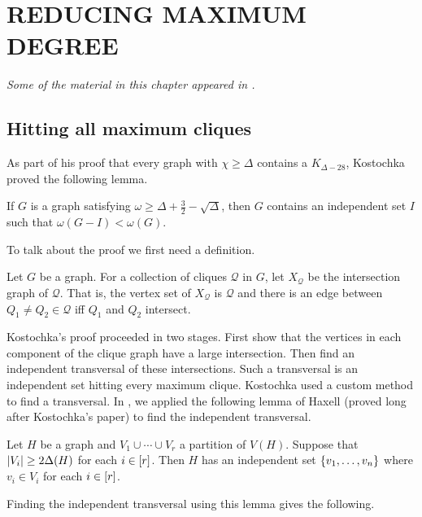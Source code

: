 \chapter{REDUCING MAXIMUM DEGREE}\label{ReductionChapter}

\begin{center}
\emph{Some of the material in this chapter appeared in
\cite{rabernhitting}.}
\end{center}

\section{Hitting all maximum cliques}
As part of his proof that every graph with $\chi \geq \Delta$ contains a $K_{\Delta - 28}$, Kostochka proved the following lemma.

\begin{lem}\label{KostochkaHitting}
If $G$ is a graph satisfying $\omega \geq \Delta + \frac32 - \sqrt{\Delta}$, then $G$ contains an independent set $I$ such that $\omega(G - I) < \omega(G)$.
\end{lem}

To talk about the proof we first need a definition.

\begin{CliqueGraph}
Let $G$ be a graph. For a collection of cliques $\mathcal{Q}$ in $G$, let $X_{\mathcal{Q}}$ be the intersection graph of $\mathcal{Q}$.  That is, the vertex set of $X_{\mathcal{Q}}$ is $\mathcal{Q}$ and there is an edge between $Q_1 \neq Q_2 \in \mathcal{Q}$ iff $Q_1$ and $Q_2$ intersect.
\end{CliqueGraph}

Kostochka's proof proceeded in two stages.  First show that the vertices in each component of the clique graph have a large intersection.  Then find an independent transversal of these intersections.  Such a transversal is an independent set hitting every maximum clique.  Kostochka used a custom method to find a transversal.  In \cite{rabernhitting}, we applied the following lemma of Haxell \cite{haxell2001note} (proved long after Kostochka's paper) to find the independent transversal.

\begin{lem}\label{HaxellLemma}
Let $H$ be a graph and $V_1 \cup \cdots \cup V_r$ a partition of $V(H)$. Suppose that $\left|V_i\right| \geq 2\Delta(H)$ for each $i \in \left[r\right]$. Then $H$ has an independent set $\left\{ v_1, \ldots, v_n \right\}$ where $v_i \in V_i$ for each $i \in \left[r\right]$.
\end{lem}
Finding the independent transversal using this lemma gives the following.

